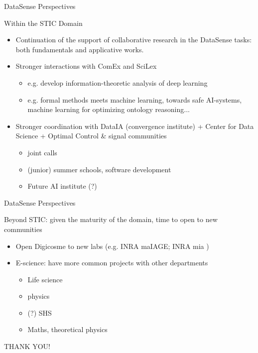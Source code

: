 \begin{frame}{DataSense Perspectives}

Within the STIC Domain

\begin{itemize}
\item Continuation of the support of collaborative research in the DataSense tasks: both fundamentals and applicative works.
\item Stronger interactions with ComEx and SciLex
  \begin{itemize}
  \item e.g. develop information-theoretic analysis of deep learning
  \item e.g. formal methods meets machine learning, towards safe AI-systems, machine learning for optimizing ontology reasoning...
  \end{itemize}
\item Stronger coordination with DataIA (convergence institute) + Center for Data Science + Optimal Control \& signal communities
  \begin{itemize}
  \item joint calls
  \item (junior) summer schools, software development
  \item Future AI institute (?)
  \end{itemize}
\end{itemize}


\end{frame}


\begin{frame}{DataSense Perspectives}

Beyond STIC: given the maturity of the domain, time to open to new communities

\begin{itemize}
\item Open Digicosme to new labs (e.g. INRA maIAGE; INRA mia )
\item E-science: have more common projects with  other departments
  \begin{itemize}
  \item Life science
  \item physics
  \item (?) SHS
  \item Maths, theoretical physics
  \end{itemize}
\end{itemize}

\end{frame}

\begin{frame}[plain]{}

  \vfill
  \begin{center}
    \huge THANK YOU!
  \end{center}
  \vfill

\end{frame}

